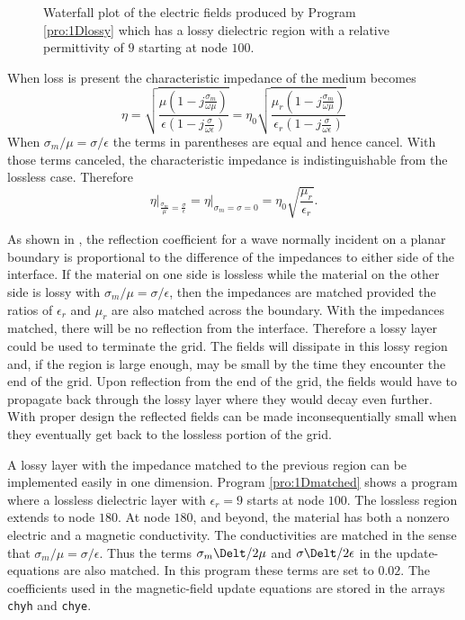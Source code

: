 \begin{figure}
  \begin{center}
  \end{center}
  \caption{Waterfall plot of the electric fields produced by Program
  \ref{pro:1Dlossy} which has a lossy dielectric region with a relative
  permittivity of $9$ starting at node $100$.}
  \label{fig:waterfallLoss}
\end{figure}

When loss is present the characteristic impedance of the medium
becomes
\begin{equation}
\eta = \sqrt{
       \frac{\mu\left(1-j\frac{\sigma_m}{\omega\mu}\right)}
            {\epsilon\left(1-j\frac{\sigma}{\omega\epsilon}\right)}}
     =  \eta_0\sqrt{
       \frac{\mu_r\left(1-j\frac{\sigma_m}{\omega\mu}\right)}
            {\epsilon_r\left(1-j\frac{\sigma}{\omega\epsilon}\right)}}
\end{equation}
When $\sigma_m/\mu = \sigma/\epsilon$ the terms in
parentheses are equal and hence cancel.  With those terms canceled,
the characteristic impedance is indistinguishable from the lossless
case.  Therefore
\begin{equation}
  \left.\eta\right|_{\frac{\sigma_m}{\mu} = \frac{\sigma}{\epsilon}}
  = \left.\eta\right|_{\sigma_m = \sigma = 0}
  = \eta_0 \sqrt{\frac{\mu_r}{\epsilon_r}}.
\end{equation}

As shown in , the reflection coefficient for a wave
normally incident on a planar boundary is proportional to the
difference of the impedances to either side of the interface.  If the
material on one side is lossless while the material on the other side
is lossy with $\sigma_m/\mu = \sigma/\epsilon$, then the impedances
are matched provided the ratios of $\epsilon_r$ and $\mu_r$ are also
matched across the boundary.  With the impedances matched, there will
be no reflection from the interface.  Therefore a lossy layer could be
used to terminate the grid.  The fields will dissipate in this lossy
region and, if the region is large enough, may be small by the time
they encounter the end of the grid.  Upon reflection from the end of
the grid, the fields would have to propagate back through the lossy
layer where they would decay even further.  With proper design the
reflected fields can be made inconsequentially small when they
eventually get back to the lossless portion of the grid.

A lossy layer with the impedance matched to the previous region can be
implemented easily in one dimension.  Program \ref{pro:1Dmatched} shows
a program where a lossless dielectric layer with $\epsilon_r=9$ starts
at node $100$.  The lossless region extends to node $180$.  At node
$180$, and beyond, the material has both a nonzero electric and a
magnetic conductivity.  The conductivities are matched in the sense
that $\sigma_m/\mu = \sigma/\epsilon$.  Thus the terms
$\sigma_m\Delt/2\mu$ and $\sigma\Delt/2\epsilon$ in the
update-equations are also matched.  In this program these terms are
set to $0.02$.  The coefficients used in the magnetic-field update
equations are stored in the arrays {\tt chyh} and {\tt chye}.


